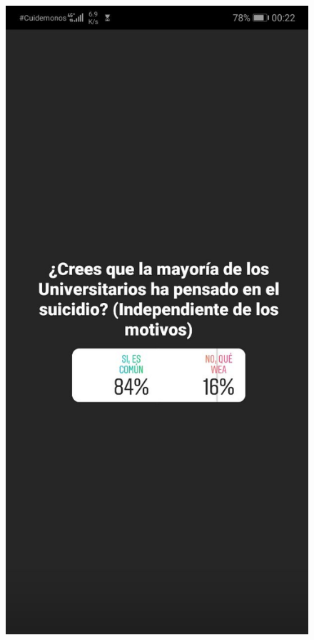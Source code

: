 \begin{figure}[h]
    \centering
    \begin{minipage}{.3\textwidth}
        \includegraphics[width=\textwidth]{imgs/insta1.jpg}

\end{minipage}
\end{figure}
